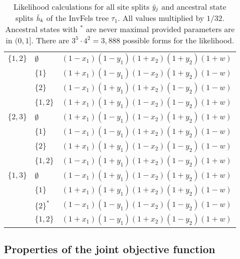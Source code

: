 \begin{table}
\begin{tabular}{|l|ll|}
$\{1,2\}$  &$\emptyset$&$(1-x_1)(1-y_1)(1+x_2)(1+y_2)(1+w)$\\
&$\{1\}$&$(1+x_1)(1-y_1)(1-x_2)(1+y_2)(1-w)$               \\
&$\{2\}$&$(1-x_1)(1+y_1)(1+x_2)(1-y_2)(1-w)$               \\
&$\{1,2\}$&$(1+x_1)(1+y_1)(1-x_2)(1-y_2)(1+w)$             \\
                                                           
$\{2,3\}$  &$\emptyset$&$(1+x_1)(1-y_1)(1-x_2)(1+y_2)(1+w)$\\
&$\{1\}$&$(1-x_1)(1-y_1)(1+x_2)(1+y_2)(1-w)$               \\
&$\{2\}$&$(1+x_1)(1+y_1)(1-x_2)(1-y_2)(1-w)$               \\
&$\{1,2\}$&$(1-x_1)(1+y_1)(1+x_2)(1-y_2)(1+w)$             \\

$\{1,3\}$  &$\emptyset$&$(1-x_1)(1+y_1)(1-x_2)(1+y_2)(1+w)$\\
&$\{1\}$&$(1+x_1)(1+y_1)(1+x_2)(1+y_2)(1-w)$               \\
&$\{2\}^*$&$(1-x_1)(1-y_1)(1-x_2)(1-y_2)(1-w)$             \\
&$\{1,2\}$&$(1+x_1)(1-y_1)(1+x_2)(1-y_2)(1+w)$             \\
\hline
\end{tabular}
\caption{
Likelihood calculations for all site splits $\tilde{y}_j$ and ancestral state splits $\tilde{h}_k$ of the InvFels tree $\tau_1$.
All values multiplied by $1/32$.
Ancestral states with $^*$ are never maximal provided parameters are in $(0,1]$.
There are $3^5\cdot 4^2=3,888$ possible forms for the likelihood.
}
\label{tab:farris_likelihoods}
\end{table}


\subsection*{Properties of the joint objective function}

